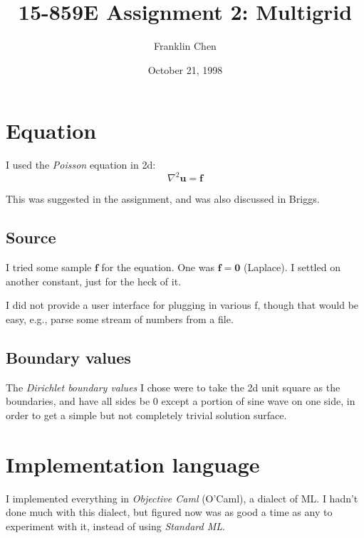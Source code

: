 \documentclass[titlepage,twoside]{article}
\author{Franklin Chen}
\title{15-859E Assignment 2: Multigrid}
\date{October 21, 1998}
\begin{document}
\maketitle

\tableofcontents
\listoffigures

\clearpage
\section{Equation}
\label{sec:equation}

I used the \emph{Poisson} equation in 2d:
\begin{displaymath}
  \nabla^2\mathbf{u} = \mathbf{f}
\end{displaymath}

This was suggested in the assignment, and was also discussed in
Briggs.


\subsection{Source}
\label{sec:source}

I tried some sample $\mathbf{f}$ for the equation.  One was
$\mathbf{f} = \mathbf{0}$ (Laplace).  I settled on another constant,
just for the heck of it.

I did not provide a user interface for plugging in various f, though
that would be easy, e.g., parse some stream of numbers from a file.


\subsection{Boundary values}
\label{sec:boundary-values}

The \emph{Dirichlet boundary values} I chose were to take the 2d unit
square as the boundaries, and have all sides be $0$ except a portion
of sine wave on one side, in order to get a simple but not completely
trivial solution surface.







\clearpage
\section{Implementation language}
\label{sec:language}

I implemented everything in \emph{Objective Caml} (O'Caml), a dialect
of ML.  I hadn't done much with this dialect, but figured now was as
good a time as any to experiment with it, instead of using
\emph{Standard ML}.
\end{document}
